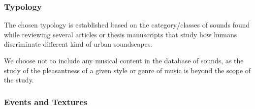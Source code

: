 \documentclass[twoside,twocolumn]{article}
\begin{document}
\subsubsection*{Typology}



The chosen typology is established based on the category/classes of sounds found while reviewing several articles or thesis manuscripts \cite{maffiolo_caracterisation_1999,raimbault2002simulation,guastavino_etude_2003,defreville2004aactivity,raimbault2005urban,dubois2006cognitive,devergie_relations_2006,guastavino2006ideal,niessen2010categories,maffiolo_caracterisation_1999,beaumont2004pertinence,polack2008perceptive,leobon_analyse_1986,brown2011towards} that study how humans discriminate different kind of urban soundscapes.


We choose not to include any musical content in the database of sounds, as the study of the pleasantness of a given style or genre of music is beyond the scope of the study.

\subsubsection*{Events and Textures}

\end{document}
